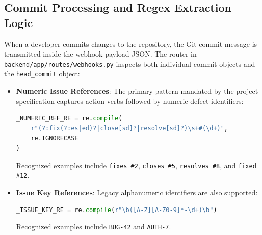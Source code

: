 \documentclass[11pt,a4paper]{article}
\begin{document}
\subsection{Commit Processing and Regex Extraction Logic}
When a developer commits changes to the repository, the Git commit message is transmitted inside the webhook payload JSON. The router in \texttt{backend/app/routes/webhooks.py} inspects both individual commit objects and the \texttt{head\_commit} object:
\begin{itemize}
    \item \textbf{Numeric Issue References}: The primary pattern mandated by the project specification captures action verbs followed by numeric defect identifiers:
\begin{lstlisting}[language=Python]
_NUMERIC_REF_RE = re.compile(
    r"(?:fix(?:es|ed)?|close[sd]?|resolve[sd]?)\s+#(\d+)",
    re.IGNORECASE
)
\end{lstlisting}
    Recognized examples include \texttt{fixes \#2}, \texttt{closes \#5}, \texttt{resolves \#8}, and \texttt{fixed \#12}.
    \item \textbf{Issue Key References}: Legacy alphanumeric identifiers are also supported:
\begin{lstlisting}[language=Python]
_ISSUE_KEY_RE = re.compile(r"\b([A-Z][A-Z0-9]*-\d+)\b")
\end{lstlisting}
    Recognized examples include \texttt{BUG-42} and \texttt{AUTH-7}.
\end{itemize}
\end{document}
